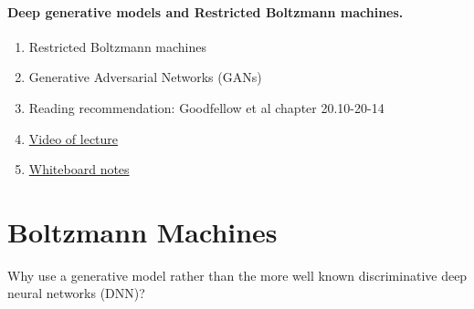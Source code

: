 \documentclass[%
oneside,                 %
final,                   %
10pt]{article}
\begin{document}
\paragraph{Deep generative models and Restricted Boltzmann machines.}
\begin{enumerate}
\item Restricted Boltzmann machines

\item Generative Adversarial Networks (GANs)

\item Reading recommendation: Goodfellow et al chapter 20.10-20-14

\item \href{{https://youtu.be/}}{Video of lecture}

\item \href{{https://github.com/CompPhysics/AdvancedMachineLearning/blob/main/doc/HandwrittenNotes/NotesApr262023.pdf}}{Whiteboard notes}
\end{enumerate}

\noindent



\section{Boltzmann Machines}

Why use a generative model rather than the more well known discriminative deep neural networks (DNN)? 
\end{document}
